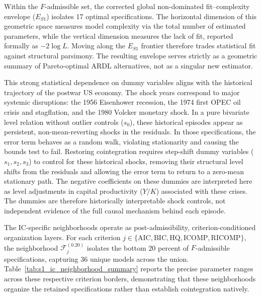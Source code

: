 \documentclass[11pt]{article}
\begin{document}
Within the \(F\)-admissible set, the corrected global non-dominated fit--complexity envelope (\(E_{S1}\)) isolates 17 optimal specifications. The horizontal dimension of this geometric space measures model complexity via the total number of estimated parameters, while the vertical dimension measures the lack of fit, reported formally as \(-2\log L\). Moving along the \(E_{S1}\) frontier therefore trades statistical fit against structural parsimony. The resulting envelope serves strictly as a geometric summary of Pareto-optimal ARDL alternatives, not as a singular new estimator.

This strong statistical dependence on dummy variables aligns with the historical trajectory of the postwar US economy. The shock years correspond to major systemic disruptions: the 1956 Eisenhower recession, the 1974 first OPEC oil crisis and stagflation, and the 1980 Volcker monetary shock. In a pure bivariate level relation without outlier controls ($s_0$), these historical episodes appear as persistent, non-mean-reverting shocks in the residuals. In those specifications, the error term behaves as a random walk, violating stationarity and causing the bounds test to fail. Restoring cointegration requires step-shift dummy variables ($s_1, s_2, s_3$) to control for these historical shocks, removing their structural level shifts from the residuals and allowing the error term to return to a zero-mean stationary path. The negative coefficients on these dummies are interpreted here as level adjustments in capital productivity ($Y/K$) associated with these crises. The dummies are therefore historically interpretable shock controls, not independent evidence of the full causal mechanism behind each episode.

The IC-specific neighborhoods operate as post-admissibility, criterion-conditioned organization layers. For each criterion \(j \in \{\mathrm{AIC},\mathrm{BIC},\mathrm{HQ},\mathrm{ICOMP},\mathrm{RICOMP}\}\), the neighborhood \(\mathcal{F}^{(0.20)}_j\) isolates the bottom 20 percent of \(F\)-admissible specifications, capturing 36 unique models across the union. Table~\ref{tab:s1_ic_neighborhood_summary} reports the precise parameter ranges across these respective criterion borders, demonstrating that these neighborhoods organize the retained specifications rather than establish cointegration natively. 
\end{document}
